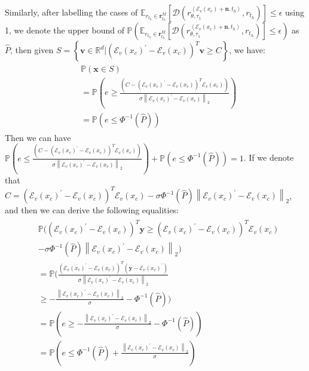 Similarly, after labelling the cases of $\mathbb{E}_{r_{t_h}\in\mathbf{r}_{t_h}^M}[\mathcal{D}(r_{\theta, \tau_1}^{\left<\mathcal{E}_v(x_c)+\mathbf{n}, t_h\right>}, r_{t_h})]\leq\epsilon$ using 1, we denote the upper bound of $\mathbb{P}(\mathbb{E}_{r_{t_h}\in\mathbf{r}_{t_h}^M}[\mathcal{D}(r_{\theta, \tau_1}^{\left<\mathcal{E}_v(x_c)+\mathbf{n}, t_h\right>}, r_{t_h})]\leq\epsilon)$ as $\hat{P}$, then given $S = \left\{\mathbf{v}\in\mathbb{R}^d|(\mathcal{E}_v(x_c)^{\prime}-\mathcal{E}_v(x_c))^T\mathbf{v}\geq C\right\}$, we have:
\begin{align}
\begin{split}
&\mathbb{P}(\mathbf{x}\in S)\\
&=\mathbb{P}(e\geq \frac{(C - (\mathcal{E}_v(x_c)^{\prime} - \mathcal{E}_v(x_c))^T\mathcal{E}_v(x_c))}{\sigma\left\|\mathcal{E}_v(x_c)^{\prime} - \mathcal{E}_v(x_c)\right\|_2})\\
&= \mathbb{P}(e\leq\Phi^{-1}(\hat{P}))
\end{split}
\end{align}
Then we can have $
\mathbb{P}(e\leq \frac{(C - (\mathcal{E}_v(x_c)^{\prime} - \mathcal{E}_v(x_c))^T\mathcal{E}_v(x_c))}{\sigma\left\|\mathcal{E}_v(x_c)^{\prime} - \mathcal{E}_v(x_c)\right\|_2}) + \mathbb{P}(e\leq\Phi^{-1}(\hat{P})) = 1$. If we denote that $C =(\mathcal{E}_v(x_c)^{\prime} - \mathcal{E}_v(x_c))^T\mathcal{E}_v(x_c) - \sigma\Phi^{-1}(\hat{P})\left\|\mathcal{E}_v(x_c)^{\prime} - \mathcal{E}_v(x_c)\right\|_2$, and then we can derive the following equalities:
\begin{align}
\begin{split}
&\mathbb{P}((\mathcal{E}_v(x_c)^{\prime}-\mathcal{E}_v(x_c))^T\mathbf{y}\geq(\mathcal{E}_v(x_c)^{\prime}-\mathcal{E}_v(x_c))^T\mathcal{E}_v(x_c)\\
&-\sigma\Phi^{-1}(\hat{P})\left\|\mathcal{E}_v(x_c)^{\prime} - \mathcal{E}_v(x_c)\right\|_2)\\
&=\mathbb{P}(\frac{(\mathcal{E}_v(x_c)^{\prime}-\mathcal{E}_v(x_c))^T(\mathbf{y}-\mathcal{E}_v(x_c)^{\prime})}{\sigma\left\|\mathcal{E}_v(x_c)^{\prime}-\mathcal{E}_v(x_c)\right\|_2}\\
&\geq-\frac{\left\|\mathcal{E}_v(x_c)^{\prime} - \mathcal{E}_v(x_c)\right\|_2}{\sigma}-\Phi^{-1}(\hat{P}))\\
&= \mathbb{P}(e\geq-\frac{\left\|\mathcal{E}_v(x_c)^{\prime}-\mathcal{E}_v(x_c)\right\|_2}{\sigma}-\Phi^{-1}(\hat{P}))\\
&=\mathbb{P}(e\leq\Phi^{-1}(\hat{P})+\frac{\left\|\mathcal{E}_v(x_c)^{\prime}-\mathcal{E}_v(x_c)\right\|_2}{\sigma})
\end{split}
\end{align}
